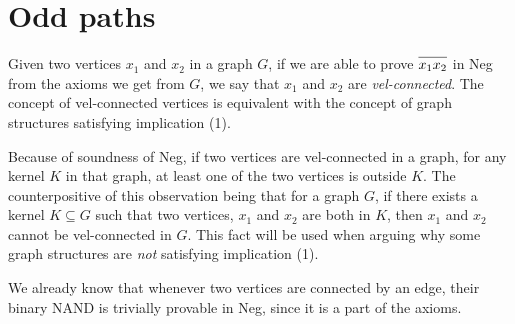 \section{Odd paths}
\label{sec:Odd paths}
Given two vertices $x_1$ and $x_2$ in a graph $G$, if we are able to prove $\ol{x_1x_2}$ in Neg from the axioms we get from $G$, we say that $x_1$ and $x_2$ are \textit{vel-connected}.
The concept of vel-connected vertices is equivalent with the concept of graph structures satisfying implication (1).

Because of soundness of Neg, if two vertices are vel-connected in a graph, for any kernel $K$ in that graph, at least one of the two vertices is outside $K$.
The counterpositive of this observation being that for a graph $G$, if there exists a kernel $K \subseteq G$ such that two vertices, $x_1$ and $x_2$ are both in $K$, then $x_1$ and $x_2$ cannot be vel-connected in $G$.
This fact will be used when arguing why some graph structures are \textit{not} satisfying implication (1).

We already know that whenever two vertices are connected by an edge, their binary NAND is trivially provable in Neg, since it is a part of the axioms.

